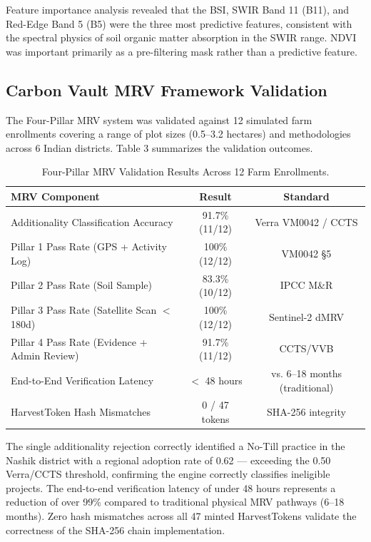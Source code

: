 \documentclass[10pt,a4paper]{article}
\begin{document}
Feature importance analysis revealed that the BSI, SWIR Band 11 (B11), and Red-Edge Band 5 (B5) were the three most predictive features, consistent with the spectral physics of soil organic matter absorption in the SWIR range. NDVI was important primarily as a pre-filtering mask rather than a predictive feature.

\subsection{Carbon Vault MRV Framework Validation}
The Four-Pillar MRV system was validated against 12 simulated farm enrollments covering a range of plot sizes (0.5--3.2 hectares) and methodologies across 6 Indian districts. Table 3 summarizes the validation outcomes.

\begin{table}[H]
\centering
\caption{Four-Pillar MRV Validation Results Across 12 Farm Enrollments.}
\begin{tabular}{|l|c|c|}
\hline
\textbf{MRV Component} & \textbf{Result} & \textbf{Standard} \\
\hline
Additionality Classification Accuracy & 91.7\% (11/12) & Verra VM0042 / CCTS \\
Pillar 1 Pass Rate (GPS + Activity Log) & 100\% (12/12) & VM0042 \S5 \\
Pillar 2 Pass Rate (Soil Sample) & 83.3\% (10/12) & IPCC M\&R \\
Pillar 3 Pass Rate (Satellite Scan $<$ 180d) & 100\% (12/12) & Sentinel-2 dMRV \\
Pillar 4 Pass Rate (Evidence + Admin Review) & 91.7\% (11/12) & CCTS/VVB \\
End-to-End Verification Latency & $<$ 48 hours & vs. 6--18 months (traditional) \\
HarvestToken Hash Mismatches & 0 / 47 tokens & SHA-256 integrity \\
\hline
\end{tabular}
\end{table}

The single additionality rejection correctly identified a No-Till practice in the Nashik district with a regional adoption rate of 0.62 — exceeding the 0.50 Verra/CCTS threshold, confirming the engine correctly classifies ineligible projects. The end-to-end verification latency of under 48 hours represents a reduction of over 99\% compared to traditional physical MRV pathways (6--18 months). Zero hash mismatches across all 47 minted HarvestTokens validate the correctness of the SHA-256 chain implementation.
\end{document}
